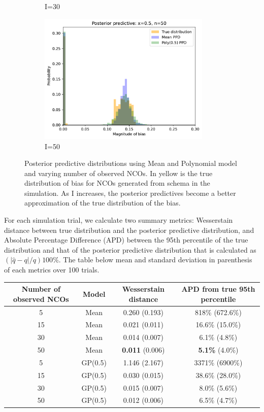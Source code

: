 \begin{figure}[H]
\begin{subfigure}{.45\textwidth}
	\caption{I=30}
\end{subfigure}%
\begin{subfigure}{.45\textwidth}
	\centering
	\includegraphics[width=0.9\textwidth]{figures/one-ppd-lrr-bias-50.pdf}
	\caption{I=50}
\end{subfigure}
\caption{Posterior predictive distributions using Mean and Polynomial model and varying number of observed NCOs. In yellow is the true distribution of bias for NCOs generated from schema in the simulation. As I increases, the posterior predictives become a better approximation of the true distribution of the bias.}
\end{figure}

For each simulation trial, we calculate two summary metrics: Wesserstain distance between true distribution and the posterior predictive distribution, and Absolute Percentage Difference (APD) between the 95th percentile of the true distribution and that of the posterior predictive distribution that is calculated as $(|\hat{q}-q|/q)100$\%. The table below mean and standard deviation in parenthesis of each metrics over 100 trials.

\begin{center}
\begin{tabular}{ |c|c|c|c| } 
\hline
Number of observed NCOs & Model & Wesserstain distance & APD from true 95th percentile\\ 
\hline
5 & Mean & 0.260 (0.193) & 818\% (672.6\%) \\
15 & Mean & 0.021 (0.011) & 16.6\% (15.0\%) \\
30 & Mean & 0.014 (0.007) & 6.1\% (4.8\%)\\
50 & Mean & \textbf{0.011} (0.006) & \textbf{5.1\%} (4.0\%)\\
5 & GP(0.5) & 1.146 (2.167) & 3371\% (6900\%)\\
15 & GP(0.5) & 0.030 (0.015) & 38.6\% (28.0\%)\\
30 & GP(0.5) & 0.015 (0.007) & 8.0\% (5.6\%)\\
50 & GP(0.5) & 0.012 (0.006) & 6.5\% (4.7\%)\\
\hline
\end{tabular}
\end{center}

